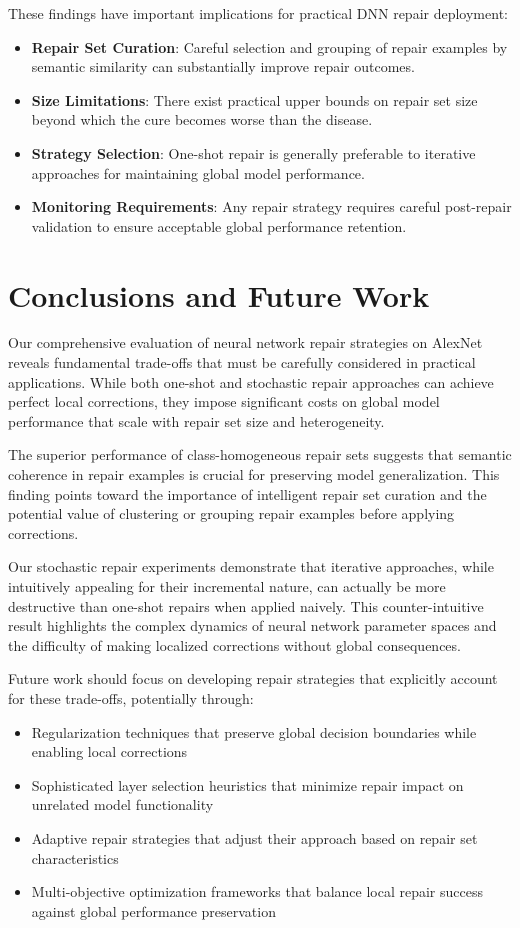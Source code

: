 \documentclass{article}
\begin{document}
These findings have important implications for practical DNN repair deployment:

\begin{itemize}
	\item \textbf{Repair Set Curation}: Careful selection and grouping of repair examples by semantic similarity can substantially improve repair outcomes.
	\item \textbf{Size Limitations}: There exist practical upper bounds on repair set size beyond which the cure becomes worse than the disease.
	\item \textbf{Strategy Selection}: One-shot repair is generally preferable to iterative approaches for maintaining global model performance.
	\item \textbf{Monitoring Requirements}: Any repair strategy requires careful post-repair validation to ensure acceptable global performance retention.
\end{itemize}

\section{Conclusions and Future Work}

Our comprehensive evaluation of neural network repair strategies on AlexNet reveals fundamental trade-offs that must be carefully considered in practical applications. While both one-shot and stochastic repair approaches can achieve perfect local corrections, they impose significant costs on global model performance that scale with repair set size and heterogeneity.

The superior performance of class-homogeneous repair sets suggests that semantic coherence in repair examples is crucial for preserving model generalization. This finding points toward the importance of intelligent repair set curation and the potential value of clustering or grouping repair examples before applying corrections.

Our stochastic repair experiments demonstrate that iterative approaches, while intuitively appealing for their incremental nature, can actually be more destructive than one-shot repairs when applied naively. This counter-intuitive result highlights the complex dynamics of neural network parameter spaces and the difficulty of making localized corrections without global consequences.

Future work should focus on developing repair strategies that explicitly account for these trade-offs, potentially through:
\begin{itemize}
	\item Regularization techniques that preserve global decision boundaries while enabling local corrections
	\item Sophisticated layer selection heuristics that minimize repair impact on unrelated model functionality
	\item Adaptive repair strategies that adjust their approach based on repair set characteristics
	\item Multi-objective optimization frameworks that balance local repair success against global performance preservation
\end{itemize}
\end{document}
